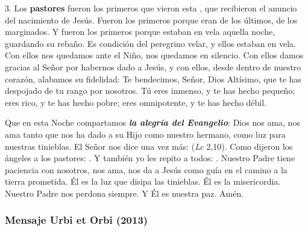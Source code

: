 \begin{body}
	3. Los \textbf{pastores} fueron los primeros que vieron esta , que recibieron el anuncio del nacimiento de Jesús. Fueron los primeros porque eran de los últimos, de los marginados. Y fueron los primeros porque estaban en vela aquella noche, guardando su rebaño. Es condición del peregrino velar, y ellos estaban en vela. Con ellos nos quedamos ante el Niño, nos quedamos en silencio. Con ellos damos gracias al Señor por habernos dado a Jesús, y con ellos, desde dentro de nuestro corazón, alabamos su fidelidad: Te bendecimos, Señor, Dios Altísimo, que te has despojado de tu rango por nosotros. Tú eres inmenso, y te has hecho pequeño; eres rico, y te has hecho pobre; eres omnipotente, y te has hecho débil.
	
	Que en esta Noche compartamos \emph{\textbf{la alegría del Evangelio}}: Dios nos ama, nos ama tanto que nos ha dado a su Hijo como nuestro hermano, como luz para nuestras tinieblas. El Señor nos dice una vez más:  (\emph{Lc} 2,10). Como dijeron los ángeles a los pastores: . Y también yo les repito a todos: . Nuestro Padre tiene paciencia con nosotros, nos ama, nos da a Jesús como guía en el camino a la tierra prometida. Él es la luz que disipa las tinieblas. Él es la misericordia. Nuestro Padre nos perdona siempre. Y Él es nuestra paz. Amén.
\end{body}

\subsubsection{Mensaje Urbi et Orbi (2013)} 


